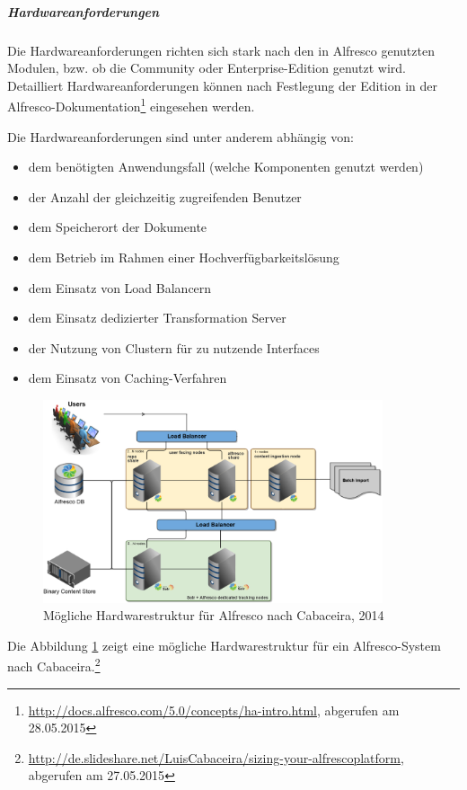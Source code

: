 \subparagraph{Hardwareanforderungen}
Die Hardwareanforderungen richten sich stark nach den in Alfresco genutzten Modulen, bzw. ob die Community oder Enterprise-Edition genutzt wird. Detailliert Hardwareanforderungen können nach Festlegung der Edition in der Alfresco-Dokumentation\footnote{\url{http://docs.alfresco.com/5.0/concepts/ha-intro.html}, abgerufen am 28.05.2015} eingesehen werden. 

Die Hardwareanforderungen sind unter anderem abhängig von:

\begin{itemize}
	\item dem benötigten Anwendungsfall (welche Komponenten genutzt werden)
	\item der Anzahl der gleichzeitig zugreifenden Benutzer
	\item dem Speicherort der Dokumente
	\item dem Betrieb im Rahmen einer Hochverfügbarkeitslösung
	\item dem Einsatz von Load Balancern
	\item dem Einsatz dedizierter Transformation Server
	\item der Nutzung von Clustern für zu nutzende Interfaces
	\item dem Einsatz von Caching-Verfahren
\end{itemize}

\begin{figure}[h!]
	\centering
	\includegraphics[width=10cm]{kapitel/gruppe4_1/bilder/deployment_diagramm_alfresco}
	\caption{Mögliche Hardwarestruktur für Alfresco nach Cabaceira, 2014}
	\label{fig_deployment_alfresco}
\end{figure}

Die Abbildung \ref{fig_deployment_alfresco} zeigt eine mögliche Hardwarestruktur für ein Alfresco-System nach Cabaceira.\footnote{\url{http://de.slideshare.net/LuisCabaceira/sizing-your-alfrescoplatform}, abgerufen am 27.05.2015}

